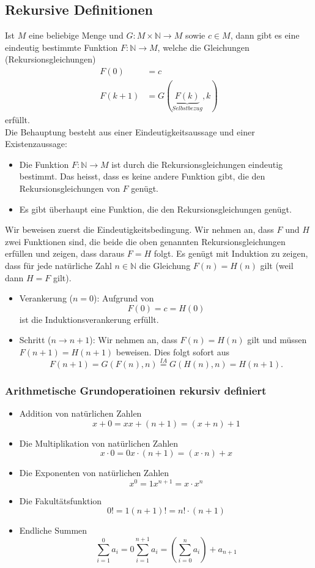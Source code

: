 \subsection{Rekursive Definitionen}
Ist $M$ eine beliebige Menge und $G:M\times\mathbb{N}\rightarrow M$ sowie $c\in M$, dann gibt es eine eindeutig bestimmte Funktion $F:\mathbb{N}\rightarrow M$, welche die Gleichungen (Rekursionsgleichungen)
\begin{align*}
	F(0)   & =c                                    \\
	F(k+1) & =G(\underbrace{F(k)}_{Selbstbezug},k)
\end{align*}
erfüllt.
\\
Die Behauptung besteht aus einer Eindeutigkeitsaussage und einer Existenzaussage:
\begin{itemize}
	\item Die Funktion $F:\mathbb{N}\to M$ ist durch die Rekursionsgleichungen eindeutig bestimmt. Das heisst, dass es keine andere  Funktion gibt, die den Rekursionsgleichungen von $F$ genügt.
	\item Es gibt überhaupt eine Funktion, die den Rekursionsgleichungen genügt.
\end{itemize}
Wir beweisen zuerst die Eindeutigkeitsbedingung. Wir nehmen an, dass $F$ und $H$ zwei Funktionen sind, die beide die oben genannten Rekursionsgleichungen erfüllen und zeigen, dass daraus $F=H$ folgt. Es genügt mit Induktion zu zeigen, dass für jede natürliche Zahl $n\in \mathbb{N}$ die Gleichung $F(n)=H(n)$ gilt (weil dann $H=F$ gilt).
\begin{itemize}
	\item Verankerung ($n=0$): Aufgrund von
	      \[
		      F(0)=c=H(0)
	      \]
	      ist die Induktionsverankerung erfüllt.
	\item Schritt ($n\to n+1$): Wir nehmen an, dass $F(n)=H(n)$ gilt und müssen $F(n+1)=H(n+1)$ beweisen. Dies folgt sofort aus
	      \[
		      F(n+1)=G(F(n),n)\stackrel{IA}{=}G(H(n),n)=H(n+1).
	      \]
\end{itemize}

\subsubsection{Arithmetische Grundoperatioinen rekursiv definiert}
\begin{itemize}
	\item Addition von natürlichen Zahlen
	      \[
		      x + 0 = x
		      x + (n + 1) = (x + n) + 1
	      \]
	\item Die Multiplikation von natürlichen Zahlen
	      \[
		      x \cdot 0 = 0
		      x \cdot (n+1) = (x \cdot n) + x
	      \]
	\item Die Exponenten von natürlichen Zahlen
	      \[
		      x^0 = 1
		      x^{n+1} = x \cdot x^n
	      \]
	\item Die Fakultätsfunktion
	      \[
		      0! = 1
		      (n + 1)! = n! \cdot (n+1)
	      \]
	\item Endliche Summen
	      \[
		      \sum_{i=1}^{0}a_i = 0
		      \sum_{i=1}^{n+1}a_i = (\sum_{i=0}^{n}a_i) + a_{n+1}
	      \]
\end{itemize}

